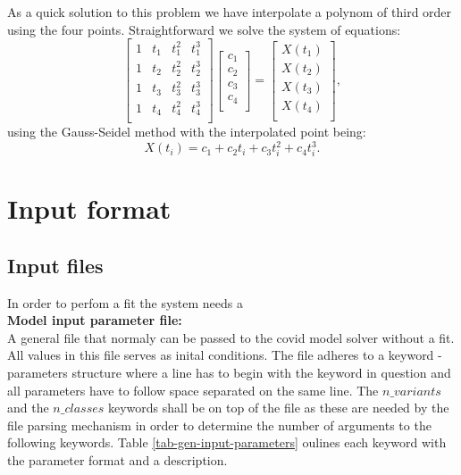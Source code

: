 \documentclass[a4paper,12pt]{article}
\begin{document}
As a quick solution to this problem we have interpolate a polynom of
third order using the four points. Straightforward we solve the system of
equations:
\begin{equation}
  \left[
    \begin{array}{cccc}
      1 & t_1 & t_1^2 & t_1^3 \\
      1 & t_2 & t_2^2 & t_2^3 \\
      1 & t_3 & t_3^2 & t_3^3 \\
      1 & t_4 & t_4^2 & t_4^3 \\
    \end{array}
    \right] \left[ \begin{array}{c}
      c_1 \\
      c_2 \\
      c_3 \\
      c_4 \\
    \end{array}
    \right] = \left[ \begin{array}{c}
      X(t_1) \\
      X(t_2) \\
      X(t_3) \\
      X(t_4) \\
      \end{array}
    \right],
\end{equation}
using the Gauss-Seidel method with the interpolated point being:
\begin{equation}
  X(t_i)=c_1+c_2t_i+c_3t_i^2+c_4t_i^3.
\end{equation}

\section{Input format}

\subsection{Input files}
 
In order to perfom a fit the system needs a \\

\textbf{Model input parameter file:} \\
  A general file that normaly can be passed to the covid model
  solver without a fit. All values in this file serves as inital
  conditions. The file adheres to a keyword - parameters structure
  where a line has to begin with the keyword in question and all
  parameters have to follow space separated on the same line. The
  $n\_variants$ and the $n\_classes$ keywords shall be on top of the
  file as these are needed by the file parsing mechanism in order to
  determine the number of arguments to the following keywords. Table
  \ref{tab-gen-input-parameters} oulines each keyword with the
  parameter format and a description. 
\end{document}
